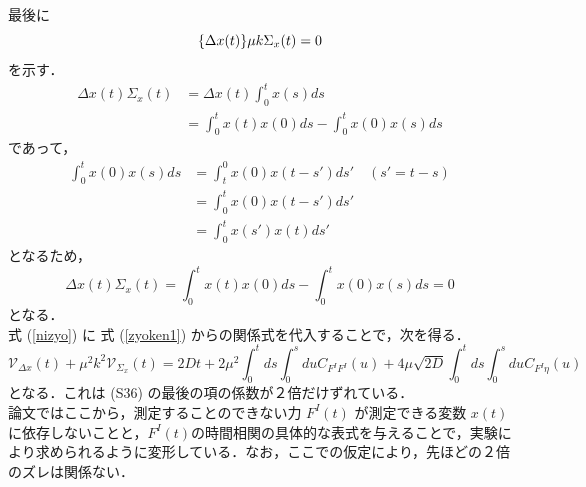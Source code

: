 \documentclass{jsarticle}
\numberwithin{equation}{section}
\theoremstyle{definition}
\begin{document}
最後に
\begin{equation}
  \qty{\Delta x(t)} \mu k \Sigma_x (t) = 0
\end{equation}
を示す．
\begin{align}
  \Delta x(t) \Sigma_x (t) &=   \Delta x(t) \int_0^t x(s) ds \\
  &= \int_0^t x(t)x(0) ds - \int_0^t x(0) x(s) ds 
\end{align}
であって，
\begin{align}
  \int_0^t x(0) x(s) ds &= \int_t^0 x(0)x(t-s') ds' \quad (s' = t-s) \\
  &= \int_0^t x(0) x(t-s') ds' \\
  &= \int_0^t x(s') x(t) ds'
\end{align}
となるため，
\begin{equation}
  \Delta x(t) \Sigma_x (t) = \int_0^t x(t)x(0) ds - \int_0^t x(0) x(s) ds = 0
\end{equation}
となる．\\
\quad 式 (\ref{nizyo}) に 式 (\ref{zyoken1}) からの関係式を代入することで，次を得る．
\begin{equation}
  \mathcal{V} _{\Delta x} (t) + \mu^2 k^2 \mathcal{V} _{\Sigma_x} (t) = 2Dt + 2\mu^2 \int_0^t ds \int_0^s du C_{F^I F^I} (u) + 4\mu \sqrt{2D} \int_0^t ds \int_0^s du C_{F^I \eta } (u)   
\end{equation}
となる．これは (S36) の最後の項の係数が２倍だけずれている．\\
論文ではここから，測定することのできない力 $F^I (t)$ が測定できる変数 $x(t)$に依存しないことと，$F^I (t)$の時間相関の具体的な表式を与えることで，実験により求められるように変形している．なお，ここでの仮定により，先ほどの２倍のズレは関係ない． \\

\newpage 
\end{document}
